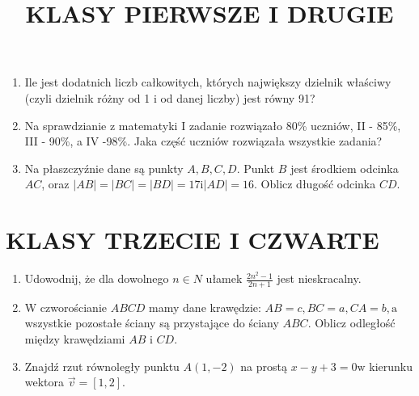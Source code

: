 \documentclass[10pt]{article}
\title{KLASY PIERWSZE I DRUGIE }
\author{}
\date{}
\begin{document}
\maketitle
\begin{enumerate}
  \item Ile jest dodatnich liczb całkowitych, których największy dzielnik właściwy (czyli dzielnik różny od 1 i od danej liczby) jest równy 91?
  \item Na sprawdzianie z matematyki I zadanie rozwiązało 80\% uczniów, II - 85\%, III - 90\%, a IV -98\%. Jaka część uczniów rozwiązała wszystkie zadania?
  \item Na płaszczyźnie dane są punkty \(A, B, C, D\). Punkt \(B\) jest środkiem odcinka \(A C\), oraz \(|A B|=|B C|=|B D|=17 \mathrm{i}|A D|=16\). Oblicz długość odcinka \(C D\).
\end{enumerate}

\section*{KLASY TRZECIE I CZWARTE}
\begin{enumerate}
  \item Udowodnij, że dla dowolnego \(n \in N\) ułamek \(\frac{2 n^{2}-1}{2 n+1}\) jest nieskracalny.
  \item W czworościanie \(A B C D\) mamy dane krawędzie: \(A B=c, B C=a, C A=b, \mathrm{a}\) wszystkie pozostałe ściany są przystające do ściany \(A B C\). Oblicz odległość między krawędziami \(A B\) i \(C D\).
  \item Znajdź rzut równoległy punktu \(A(1,-2)\) na prostą \(x-y+3=0 \mathrm{w}\) kierunku wektora \(\vec{v}=[1,2]\).
\end{enumerate}
\end{document}
